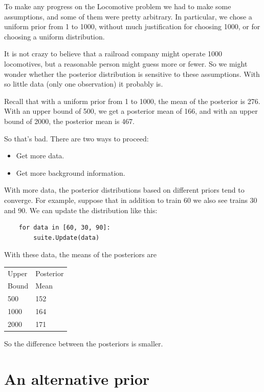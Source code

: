 \documentclass[12pt]{book}
\begin{document}
To make any progress on the Locomotive problem we had to make
some assumptions, and some of them were pretty arbitrary.  In
particular, we chose a uniform prior from 1 to 1000, without
much justification for choosing 1000, or for choosing a uniform
distribution.

It is not crazy to believe that a railroad company might operate
1000 locomotives, but a reasonable person might guess more or fewer.
So we might wonder whether the posterior distribution is sensitive
to these assumptions.  With so little data (only one observation)
it probably is.

Recall that with a uniform prior from 1 to 1000, the mean of
the posterior is 276.  With an upper bound of 500, we get a
posterior mean of 166, and with an upper bound of 2000,
the posterior mean is 467.

So that's bad.  There are two ways to proceed:

\begin{itemize}

\item Get more data.

\item Get more background information.

\end{itemize}

With more data, the posterior distributions based on different
priors tend to converge.  For example, suppose that in addition
to train 60 we also see trains 30 and 90.  We can update the
distribution like this:

\begin{verbatim}
    for data in [60, 30, 90]:
        suite.Update(data)
\end{verbatim}

With these data, the means of the posteriors are

  \begin{tabular}{|l|l|}
  \hline
  Upper & Posterior \\
  Bound & Mean \\
  \hline
  500 & 152 \\
  1000 & 164\\
  2000 & 171\\
  \hline
  \end{tabular}

So the difference between the posteriors is smaller.


\section{An alternative prior}
\end{document}
